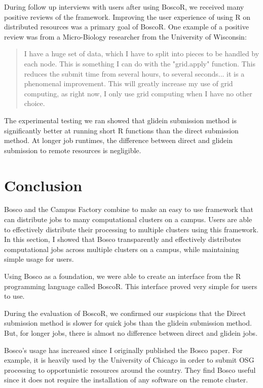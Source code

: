 During follow up interviews with users after using BoscoR, we received many positive reviews of the framework.  Improving the user experience of using R on distributed resources was a primary goal of BoscoR.  One example of a positive review was from a Micro-Biology researcher from the University of Wisconsin:
\begin{quote}
I have a huge set of data, which I have to split into pieces to be handled by each node.  This is something I can do with the "grid.apply" function. This reduces the submit time from several hours, to several seconds... it is a  phenomenal improvement. This will greatly increase my use of grid computing, as right now, I only use grid computing when I have no other choice.
\end{quote}

The experimental testing we ran showed that glidein submission method is significantly better at running short R functions than the direct submission method.  At longer job runtimes, the difference between direct and glidein submission to remote resources is negligible.






\section{Conclusion}

Bosco and the Campus Factory combine to make an easy to use framework that can distribute jobs to many computational clusters on a campus.  Users are able to effectively distribute their processing to multiple clusters using this framework.  In this section, I showed that Bosco transparently and effectively distributes computational jobs across multiple clusters on a campus, while maintaining simple usage for users.

Using Bosco as a foundation, we were able to create an interface from the R programming language called BoscoR.  This interface proved very simple for users to use.  

During the evaluation of BoscoR, we confirmed our suspicions that the Direct submission method is slower for quick jobs than the glidein submission method.  But, for longer jobs, there is almost no difference between direct and glidein jobs.

Bosco's usage has increased since I originally published the Bosco paper.  For example, it is heavily used by the University of Chicago in order to submit OSG processing to opportunistic resources around the country.  They find Bosco useful since it does not require the installation of any software on the remote cluster.

